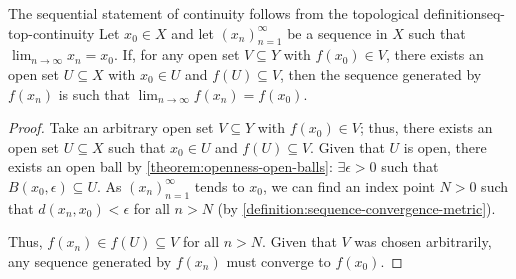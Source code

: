 \documentclass{article}
\numberwithin{equation}{section}
\numberwithin{figure}{section}
\begin{document}
\begin{theorem}{The sequential statement of continuity follows from the
        topological definition}{seq-top-continuity}
    Let $ x_0 \in X $ and let $ \left( x_n \right)_{n=1}^\infty $ be a sequence
    in $ X $ such that $ \lim_{n \to \infty} x_n = x_0 $. If, for any open set $
    V \subseteq Y $ with $ f\left( x_0 \right) \in V$, there exists an open set
    $ U \subseteq X $ with $ x_0 \in U $ and $ f(U) \subseteq V $, then the
    sequence generated by $ f\left( x_n \right) $ is such that $ \lim_{n \to
    \infty} f\left(x_n\right) = f\left(x_0\right) $.
    \begin{proof}
        Take an arbitrary open set $ V \subseteq Y $ with $ f\left(x_0\right)
        \in V $; thus, there exists an open set $ U \subseteq X $ such that $
        x_0 \in U $ and $ f(U) \subseteq V $. Given that $ U $ is open, there
        exists an open ball by \cref{theorem:openness-open-balls}: $ \exists
        \epsilon > 0 $ such that $ B\left(x_0, \epsilon\right) \subseteq U $. As
        $ \left(x_n\right)_{n=1}^\infty $ tends to $ x_0 $, we can find an index
        point $ N > 0 $ such that $ d\left(x_n, x_0\right) < \epsilon $ for all
        $ n > N $ (by \cref{definition:sequence-convergence-metric}).

        Thus, $ f\left(x_n\right) \in f(U) \subseteq V $ for all $ n > N $.
        Given that $ V $ was chosen arbitrarily, any sequence generated by $
        f\left(x_n\right) $ must converge to $ f\left(x_0\right) $.
    \end{proof}
\end{theorem}
\end{document}
